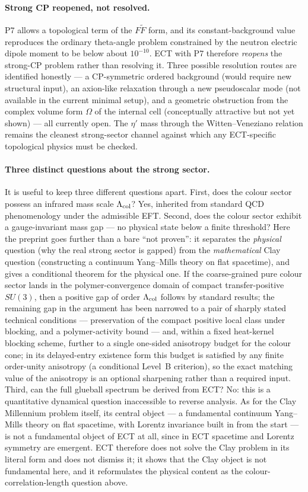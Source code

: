 \documentclass[11pt,a4paper]{article}
\begin{document}
\paragraph{Strong CP reopened, not resolved.} P7 allows a topological term of the $F\tilde F$ form, and its constant-background value reproduces the ordinary theta-angle problem constrained by the neutron electric dipole moment to be below about $10^{-10}$. ECT with P7 therefore \emph{reopens} the strong-CP problem rather than resolving it. Three possible resolution routes are identified honestly --- a CP-symmetric ordered background (would require new structural input), an axion-like relaxation through a new pseudoscalar mode (not available in the current minimal setup), and a geometric obstruction from the complex volume form $\Omega$ of the internal cell (conceptually attractive but not yet shown) --- all currently open. The $\eta'$ mass through the Witten--Veneziano relation remains the cleanest strong-sector channel against which any ECT-specific topological physics must be checked.

\paragraph{Three distinct questions about the strong sector.} It is useful to keep three different questions apart. First, does the colour sector possess an infrared mass scale $\Lambda_{\rm col}$? Yes, inherited from standard QCD phenomenology under the admissible EFT. Second, does the colour sector exhibit a gauge-invariant mass gap --- no physical state below a finite threshold? Here the preprint goes further than a bare ``not proven'': it separates the \emph{physical} question (why the real strong sector is gapped) from the \emph{mathematical} Clay question (constructing a continuum Yang--Mills theory on flat spacetime), and gives a conditional theorem for the physical one. If the coarse-grained pure colour sector lands in the polymer-convergence domain of compact transfer-positive $SU(3)$, then a positive gap of order $\Lambda_{\rm col}$ follows by standard results; the remaining gap in the argument has been narrowed to a pair of sharply stated technical conditions --- preservation of the compact positive local class under blocking, and a polymer-activity bound --- and, within a fixed heat-kernel blocking scheme, further to a single one-sided anisotropy budget for the colour cone; in its delayed-entry existence form this budget is satisfied by any finite order-unity anisotropy (a conditional Level~B criterion), so the exact matching value of the anisotropy is an optional sharpening rather than a required input. Third, can the full glueball spectrum be derived from ECT? No: this is a quantitative dynamical question inaccessible to reverse analysis. As for the Clay Millennium problem itself, its central object --- a fundamental continuum Yang--Mills theory on flat spacetime, with Lorentz invariance built in from the start --- is not a fundamental object of ECT at all, since in ECT spacetime and Lorentz symmetry are emergent. ECT therefore does not solve the Clay problem in its literal form and does not dismiss it; it shows that the Clay object is not fundamental here, and it reformulates the physical content as the colour-correlation-length question above.
\end{document}

